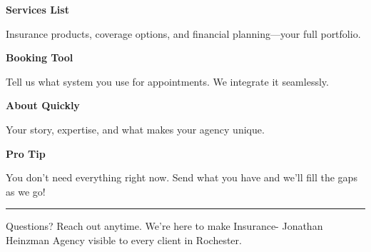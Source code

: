 \documentclass[11pt,letterpaper]{article}
\begin{document}
\hfill
\begin{minipage}[t]{0.48\textwidth}
\begin{tcolorbox}[colframe=accent-teal, boxrule=1pt, left=0.7em, right=0.7em, top=0.5em, bottom=0.5em, arc=4pt, boxsep=0pt]
{\bfseries\small\color{accent-teal}Services List}

\vspace{0.15em}

{\small Insurance products, coverage options, and financial planning—your full portfolio.}
\end{tcolorbox}

\vspace{0.1em}

\begin{tcolorbox}[colframe=accent-teal, boxrule=1pt, left=0.7em, right=0.7em, top=0.5em, bottom=0.5em, arc=4pt, boxsep=0pt]
{\bfseries\small\color{accent-teal}Booking Tool}

\vspace{0.15em}

{\small Tell us what system you use for appointments. We integrate it seamlessly.}
\end{tcolorbox}

\vspace{0.1em}

\begin{tcolorbox}[colframe=accent-teal, boxrule=1pt, left=0.7em, right=0.7em, top=0.5em, bottom=0.5em, arc=4pt, boxsep=0pt]
{\bfseries\small\color{accent-teal}About Quickly}

\vspace{0.15em}

{\small Your story, expertise, and what makes your agency unique.}
\end{tcolorbox}

\vspace{-0.2em}
\end{minipage}

\vspace{0.15em}

\begin{tcolorbox}[colback={accent-red!5}, colframe=accent-red!20, boxrule=0.5pt, left=0.7em, right=0.7em, top=0.4em, bottom=0.4em, arc=6pt, boxsep=0pt]

{\bfseries\small\color{accent-red}Pro Tip}

\vspace{0.1em}

{\small You don't need everything right now. Send what you have and we'll fill the gaps as we go!}

\end{tcolorbox}

\vspace{0.15em}

\noindent\hrule
\vspace{0.2em}

{\small\color{text-light}Questions? Reach out anytime. We're here to make Insurance- Jonathan Heinzman Agency visible to every client in Rochester.}
\end{document}
